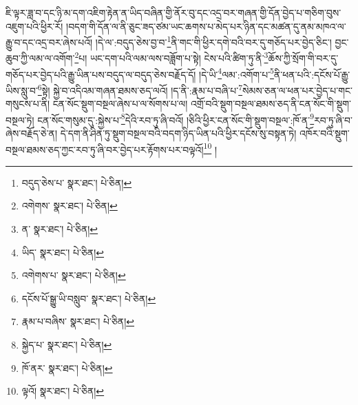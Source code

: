 ཇི་ལྟར་ཟླ་བ་དང་ཉི་མ་དག་འཇིག་རྟེན་ན་ཡིད་བཞིན་གྱི་ནོར་བུ་དང་འདྲ་བར་གཞན་གྱི་དོན་བྱེད་པ་གཅིག་བུས་འཇུག་པའི་ཕྱིར་རོ། །བདག་གི་དོན་ལ་ནི་ཅུང་ཟད་ཙམ་ཡང་ཆགས་པ་མེད་པར་ཉིན་དང་མཚན་དུ་ནམ་མཁའ་ལ་རྒྱུ་བ་དང་འདྲ་བར་ཞེས་པའོ། །དེ་ལ་:བདུད་ཅེས་བྱ་བ་\footnote{བདུད་ཅེས་པ་  སྣར་ཐང་།  པེ་ཅིན། }ནི་གང་གི་ཕྱིར་དགེ་བའི་བར་དུ་གཅོད་པར་བྱེད་ཅིང་། བྱང་ཆུབ་ཀྱི་ལམ་ལ་འགོག་\footnote{འགེགས་  སྣར་ཐང་།  པེ་ཅིན། }པ། ཡང་དག་པའི་ལམ་ལས་བཟློག་པ་སྟེ། ངེས་པའི་ཚིག་ཏུ་ནི་\footnote{ན་  སྣར་ཐང་།  པེ་ཅིན། }ཆོས་ཀྱི་སྲོག་གི་བར་དུ་གཅོད་པར་བྱེད་པའི་རྒྱུ་ཡིན་པས་བདུད་ལ་བདུད་ཅེས་བརྗོད་དོ། །དེ་ཡི་\footnote{ཡིད་  སྣར་ཐང་།  པེ་ཅིན། }ལམ་:འགོག་པ་\footnote{འགེགས་པ་  སྣར་ཐང་།  པེ་ཅིན། }ནི་ཕན་པའི་:དངོས་པོ་རྒྱུ་ཡིས་སླུ་བ་\footnote{དངོས་པོ་སྒྱུ་ཡི་བསླུབ་  སྣར་ཐང་།  པེ་ཅིན། }སྟེ། སྐྱེ་བ་འདིའམ་གཞན་ཐམས་ཅད་ལའོ། །ད་ནི་:རྣམ་པ་བཞི་པ་\footnote{རྣམ་པ་བཞིས་  སྣར་ཐང་།  པེ་ཅིན། }སེམས་ཅན་ལ་ཕན་པར་བྱེད་པ་གང་གསུངས་པ་ནི། ངན་སོང་སྡུག་བསྔལ་ཞེས་པ་ལ་སོགས་པ་ལ། འགྲོ་བའི་སྡུག་བསྔལ་ཐམས་ཅད་ནི་ངན་སོང་གི་སྡུག་བསྔལ་ཏེ། ངན་སོང་གསུམ་དུ་:སྐྱེས་པ་\footnote{སྐྱེད་པ་  སྣར་ཐང་།  པེ་ཅིན། }དེའི་རབ་ཏུ་ཞི་བའོ། །ཅིའི་ཕྱིར་ངན་སོང་གི་སྡུག་བསྔལ་:ཁོ་ན་\footnote{ཁོ་ནར་  སྣར་ཐང་།  པེ་ཅིན། }རབ་ཏུ་ཞི་བ་ཞེས་བརྗོད་ཅེ་ན། དེ་དག་ནི་ཤིན་ཏུ་སྡུག་བསྔལ་བའི་བདག་ཉིད་ཡིན་པའི་ཕྱིར་དངོས་སུ་བསྟན་ཏེ། འཁོར་བའི་སྡུག་བསྔལ་ཐམས་ཅད་ཀྱང་རབ་ཏུ་ཞི་བར་བྱེད་པར་རྟོགས་པར་བལྟའོ།\footnote{ལྟའོ།  སྣར་ཐང་།  པེ་ཅིན། } །

